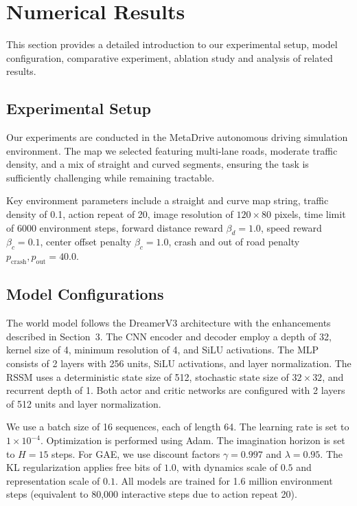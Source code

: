 \section{Numerical Results} 
\label{04_experiments}

This section provides a detailed introduction to our experimental setup, model configuration, comparative experiment, ablation study and analysis of related results.

\subsection{Experimental Setup}
Our experiments are conducted in the MetaDrive\cite{li2022metadrive} autonomous driving simulation environment. The map we selected featuring multi-lane roads, moderate traffic density, and a mix of straight and curved segments, ensuring the task is sufficiently challenging while remaining tractable.

Key environment parameters include a straight and curve map string, traffic density of 0.1, action repeat of 20, image resolution of $120 \times 80$ pixels, time limit of 6000 environment steps, forward distance reward $\beta_d = 1.0$, speed reward $\beta_c = 0.1$, center offset penalty $\beta_c = 1.0$, crash and out of road penalty $p_{\text{crash}},p_{\text{out}} = 40.0$.

\subsection{Model Configurations}
The world model follows the DreamerV3 architecture with the enhancements described in Section~3. The CNN encoder and decoder employ a depth of 32, kernel size of 4, minimum resolution of 4, and SiLU activations. The MLP consists of 2 layers with 256 units, SiLU activations, and layer normalization. The RSSM uses a deterministic state size of 512, stochastic state size of $32 \times 32$, and recurrent depth of 1. Both actor and critic networks are configured with 2 layers of 512 units and layer normalization.

We use a batch size of 16 sequences, each of length 64. The learning rate is set to $1 \times 10^{-4}$. Optimization is performed using Adam. The imagination horizon is set to $H = 15$ steps. For GAE, we use discount factors $\gamma = 0.997$ and $\lambda = 0.95$. The KL regularization applies free bits of $1.0$, with dynamics scale of $0.5$ and representation scale of $0.1$. All models are trained for 1.6 million environment steps (equivalent to 80,000 interactive steps due to action repeat 20). 

